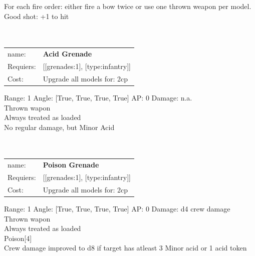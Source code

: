 For each fire order: either fire a bow twice or use one thrown weapon per model. Good shot: +1 to hit\\ 









\ \\
\ \\
\begin{tabular}{ll}
name: & {\bf Acid Grenade } \\
Requiers: & [[grenades:1], [type:infantry]] \\
Cost: & Upgrade all models for: 2cp \\
\end{tabular}



Range: 1  Angle: [True, True, True, True] AP: 0 Damage: n.a. \\
Thrown wapon\\ 
Always treated as loaded\\ 
No regular damage, but Minor Acid\\ 








\ \\
\ \\
\begin{tabular}{ll}
name: & {\bf Poison Grenade } \\
Requiers: & [[grenades:1], [type:infantry]] \\
Cost: & Upgrade all models for: 2cp \\
\end{tabular}



Range: 1  Angle: [True, True, True, True] AP: 0 Damage: d4 crew damage \\
Thrown wapon\\ 
Always treated as loaded\\ 
Poison[4]\\ 
Crew damage improved to d8 if target has atleast 3 Minor acid or 1 acid token\\ 








\ \\
